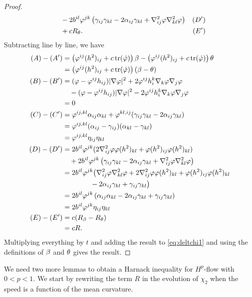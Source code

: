 \documentclass{amsart}
\begin{document}
\begin{proof}
\begin{align*}
&\quad - 2b^{il} \varphi^{jk} \left(\gamma_{ij} \gamma_{kl} - 2\alpha_{ij} \gamma_{kl} + \nabla^2_{ij}\varphi\nabla^2_{kl}\varphi\right) & (D') \\
&\quad + cR_{\theta}. & (E')
\end{align*}
Subtracting line by line, we have
\begin{align*}
(A) - (A') &= \left(\varphi^{ij}(h^2)_{ij} + c\operatorname{tr}(\dot{\varphi}) \right)\beta - \left(\varphi^{ij}(h^2)_{ij} + c\operatorname{tr}(\dot{\varphi}) \right)\theta \\
        &= \left(\varphi^{ij}(h^2)_{ij} + c\operatorname{tr}(\dot{\varphi}) \right)(\beta - \theta) \\
(B) - (B') &= (\varphi - \varphi^{ij}h_{ij}) |\nabla\varphi|^{2} + 2\varphi^{ij}h^{k}_{i}\nabla_k \varphi \nabla_j \varphi \\ 
    &\quad - (\varphi - \varphi^{ij}h_{ij})|\nabla\varphi|^{2} - 2\varphi^{ij}h^{k}_{i}\nabla_k\varphi\nabla_j\varphi \\    
        &= 0 \\
(C) - (C') &= \varphi^{ij,kl} \alpha_{ij} \alpha_{kl} + \varphi^{kl,ij} (\gamma_{ij}\gamma_{kl}  - 2\alpha_{ij} \gamma_{kl})\\ 
    &= \varphi^{ij,kl} (\alpha_{ij} - \gamma_{ij}) (\alpha_{kl} - \gamma_{kl}) \\
&= \varphi^{ij,kl} \eta_{ij} \eta_{kl} \\
(D) - (D') &= 2b^{il}\varphi^{jk} (2\nabla^2_{ij}\varphi\varphi(h^2)_{kl} + \varphi(h^2)_{ij}\varphi(h^2)_{kl}) \\
&\quad + 2b^{il} \varphi^{jk} \left(\gamma_{ij} \gamma_{kl} - 2\alpha_{ij} \gamma_{kl} + \nabla^2_{ij}\varphi\nabla^2_{kl}\varphi\right) \\
&= 2b^{il}\varphi^{jk} \big(\nabla^2_{ij}\varphi\nabla^2_{kl}\varphi +2\nabla^2_{ij}\varphi\varphi(h^2)_{kl} + \varphi(h^2)_{ij}\varphi(h^2)_{kl} \\
    &\qquad\qquad - 2 \alpha_{ij} \gamma_{kl} + \gamma_{ij} \gamma_{kl} \big) \\
&= 2b^{il}\varphi^{jk} \left(\alpha_{ij}\alpha_{kl} - 2 \alpha_{ij} \gamma_{kl} + \gamma_{ij} \gamma_{kl} \right) \\ 
    &= 2b^{il}\varphi^{jk} \eta_{ij} \eta_{kl} \\
(E) - (E') &= c(R_{\beta} - R_{\theta}) \\ 
    &= cR.\\
\end{align*}
Multiplying everything by \(t\) and adding the result to \cref{eq:deltchi1} and using the definitions of $\beta$ and $\theta$ gives the result.
\end{proof}
We need two more lemmas to obtain a Harnack inequality for $H^{p}$-flow with $0<p<1.$  We start by rewriting the term $R$ in the evolution of \(\chi_2\) when the speed is a function of the mean curvature.
\end{document}
